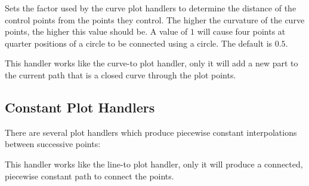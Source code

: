 \begin{command}{\pgfsetplottension{}}
  Sets the factor used by the curve plot handlers to determine the
  distance of the control points from the points they control. The
  higher the curvature of the curve points, the higher this value
  should be. A value of $1$ will cause four points at quarter
  positions of a circle to be connected using a circle. The default is
  $0.5$. 

\begin{codeexample}[]
\end{codeexample}
\end{command}


\begin{command}{\pgfplothandlerclosedcurve}
  This handler works like the curve-to plot handler, only it will
  add a new part to the current path that is a closed curve through
  the plot points.
\begin{codeexample}[]
\end{codeexample}
\end{command}

\subsection{Constant Plot Handlers}
There are several plot handlers which produce piecewise constant interpolations between successive points:

\begin{command}{\pgfplothandlerconstantlineto}
  This handler works like the line-to plot handler, only it will
  produce a connected, piecewise constant path to connect the points.
\begin{codeexample}[]
\end{codeexample}
\end{command}

